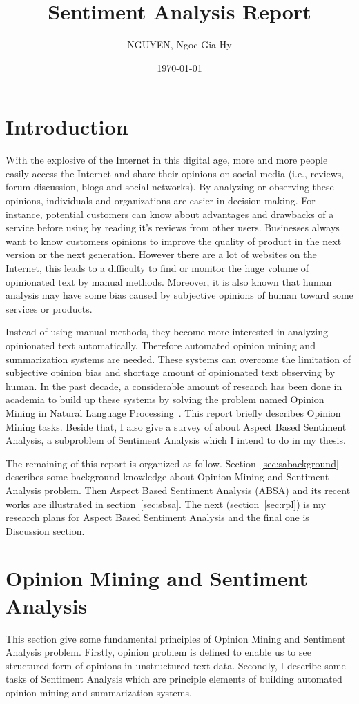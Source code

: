 \documentclass{article}
\title{Sentiment Analysis Report}
\author{NGUYEN, Ngoc Gia Hy }
\date{\today}
\begin{document}
\maketitle

\section{Introduction}

With the explosive of the Internet in this digital age, more and more people easily access the Internet and share their opinions on social media (i.e., reviews, forum discussion, blogs and social networks). 
By analyzing or observing these opinions, individuals and organizations are easier in decision making. 
For instance, potential customers can know about advantages and drawbacks of a service before using by reading it's reviews from other users.
Businesses always want to know customers opinions to improve the quality of product in the next version or the next generation. 
However there are a lot of websites on the Internet, this leads to a difficulty to find or monitor the huge volume of opinionated text by manual methods.
Moreover, it is also known that human analysis may have some bias caused by  subjective opinions of human toward some services or products.

Instead of using manual methods, they become more interested in analyzing opinionated text automatically.
Therefore automated opinion mining and summarization systems are needed.
These systems can overcome the limitation of subjective opinion bias and shortage amount of opinionated text observing by human.
In the past decade, a considerable amount of research has been done in academia to build up these systems by solving the problem named Opinion Mining in Natural Language Processing~\cite{Liu10sentimentanalysis,Pang:2008:OMS:1454711.1454712}.
This report briefly describes Opinion Mining tasks.
Beside that, I also give a survey of about Aspect Based Sentiment Analysis, a subproblem of Sentiment Analysis which I intend to do in my thesis.

The remaining of this report is organized as follow.
Section~\ref{sec:sabackground} describes some background knowledge about Opinion Mining and Sentiment Analysis problem. 
Then Aspect Based Sentiment Analysis (ABSA) and its recent works are illustrated in section~\ref{sec:sbsa}. 
The next (section~\ref{sec:rpl})  is my research plans for Aspect Based Sentiment Analysis and the final one is Discussion section.

\section{Opinion Mining and Sentiment Analysis}
This section give some fundamental principles of Opinion Mining and Sentiment Analysis problem.
Firstly, opinion problem is defined to enable us to see structured form of  opinions in unstructured text data.
Secondly, I describe some tasks of Sentiment Analysis which are principle elements of building automated opinion mining and summarization systems.
\end{document}
